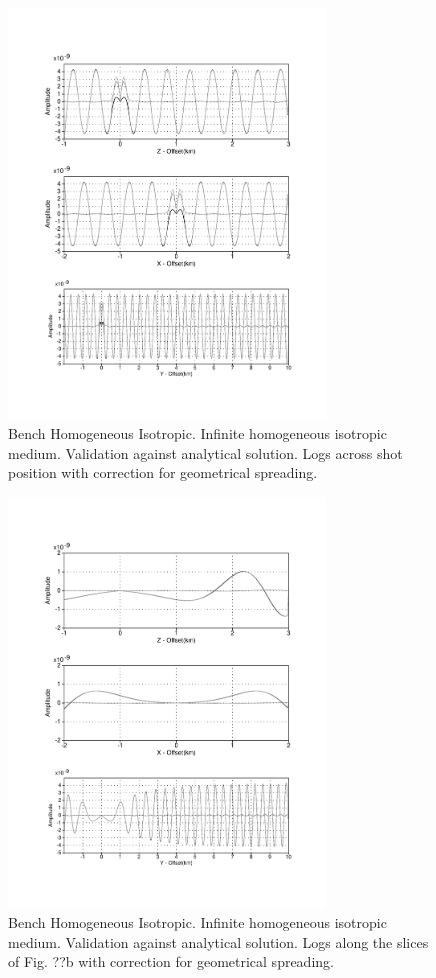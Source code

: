 \begin{figure}[!h]
\centering 
\includegraphics[width=0.75\textwidth]{images/dsfdm/fig1_log_homogeneous_isotropic.pdf}
\caption{Bench Homogeneous Isotropic. Infinite homogeneous isotropic medium. Validation against analytical
solution. Logs across shot position with correction for geometrical spreading.}
\label{fig1_log_homogeneous_isotropic} 
\end{figure}
\begin{figure}[!h]
\centering 
\includegraphics[width=0.75\textwidth]{images/dsfdm/fig2_log_homogeneous_isotropic.pdf}
\caption{Bench Homogeneous Isotropic. Infinite homogeneous isotropic medium. Validation against analytical
solution. Logs along the slices of Fig. ??b with correction for geometrical spreading.}
\label{fig2_log_homogeneous_isotropic} 
\end{figure}

